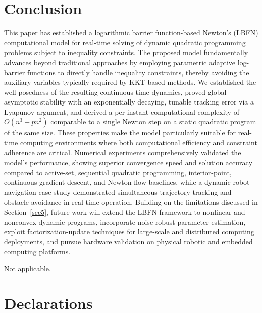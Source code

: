 \documentclass[pdflatex,sn-mathphys,Numbered]{sn-jnl}
\theoremstyle{thmstyleone}
\theoremstyle{thmstyletwo}
\theoremstyle{thmstylethree}
\begin{document}
\section{Conclusion}\label{sec6}
This paper has established a logarithmic barrier function-based Newton's (LBFN) computational model for real-time solving of dynamic quadratic programming problems subject to inequality constraints. The proposed model fundamentally advances beyond traditional approaches by employing parametric adaptive log-barrier functions to directly handle inequality constraints, thereby avoiding the auxiliary variables typically required by KKT-based methods. We established the well-posedness of the resulting continuous-time dynamics, proved global asymptotic stability with an exponentially decaying, tunable tracking error via a Lyapunov argument, and derived a per-instant computational complexity of $O(n^3+pn^2)$ comparable to a single Newton step on a static quadratic program of the same size. These properties make the model particularly suitable for real-time computing environments where both computational efficiency and constraint adherence are critical. Numerical experiments comprehensively validated the model's performance, showing superior convergence speed and solution accuracy compared to active-set, sequential quadratic programming, interior-point, continuous gradient-descent, and Newton-flow baselines, while a dynamic robot navigation case study demonstrated simultaneous trajectory tracking and obstacle avoidance in real-time operation. Building on the limitations discussed in Section~\ref{sec5}, future work will extend the LBFN framework to nonlinear and nonconvex dynamic programs, incorporate noise-robust parameter estimation, exploit factorization-update techniques for large-scale and distributed computing deployments, and pursue hardware validation on physical robotic and embedded computing platforms.

\backmatter

Not applicable.

\section*{Declarations}
\end{document}
